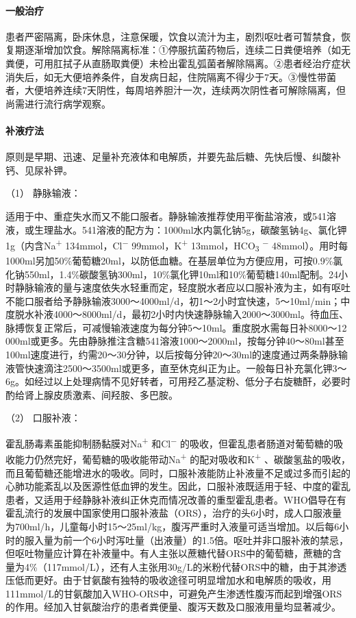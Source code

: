 \paragraph{一般治疗}

患者严密隔离，卧床休息，注意保暖，饮食以流汁为主，剧烈呕吐者可暂禁食，恢复期逐渐增加饮食。解除隔离标准：①停服抗菌药物后，连续二日粪便培养（如无粪便，可用肛拭子从直肠取粪便）未检出霍乱弧菌者解除隔离。②患者经治疗症状消失后，如无大便培养条件，自发病日起，住院隔离不得少于7天。③慢性带菌者，大便培养连续7天阴性，每周培养胆汁一次，连续两次阴性者可解除隔离，但尚需进行流行病学观察。

\paragraph{补液疗法}

原则是早期、迅速、足量补充液体和电解质，并要先盐后糖、先快后慢、纠酸补钙、见尿补钾。

\hypertarget{text00229.htmlux5cux23CHP7-10-3-2-1}{}
（1） 静脉输液：

适用于中、重症失水而又不能口服者。静脉输液推荐使用平衡盐溶液，或541溶液，或生理盐水。541溶液的配方为：1000ml水内氯化钠5g，碳酸氢钠4g、氯化钾1g（内含Na\textsuperscript{+}
134mmol，Cl\textsuperscript{−} 99mmol，K\textsuperscript{+}
13mmol，HCO\textsubscript{3} \textsuperscript{−}
48mmol）。用时每1000ml另加50\%葡萄糖20ml，以防低血糖。在基层单位为方便应用，可按0.9\%氯化钠550ml，1.4\%碳酸氢钠300ml，10\%氯化钾10ml和10\%葡萄糖140ml配制。24小时静脉输液的量与速度依失水轻重而定，轻度脱水者应以口服补液为主，如有呕吐不能口服者给予静脉输液3000～4000ml/d，初1～2小时宜快速，5～10ml/min；中度脱水补液4000～8000ml/d，最初2小时内快速静脉输入2000～3000ml。待血压、脉搏恢复正常后，可减慢输液速度为每分钟5～10ml。重度脱水需每日补8000～12
000ml或更多。先由静脉推注含糖541溶液1000～2000ml，按每分钟40～80ml甚至100ml速度进行，约需20～30分钟，以后按每分钟20～30ml的速度通过两条静脉输液管快速滴注2500～3500ml或更多，直至休克纠正为止。一般每日补充氯化钾3～6g。如经过以上处理病情不见好转者，可用羟乙基淀粉、低分子右旋糖酐，必要时酌给肾上腺皮质激素、间羟胺、多巴胺。

\hypertarget{text00229.htmlux5cux23CHP7-10-3-2-2}{}
（2） 口服补液：

霍乱肠毒素虽能抑制肠黏膜对Na\textsuperscript{+} 和Cl\textsuperscript{−}
的吸收，但霍乱患者肠道对葡萄糖的吸收能力仍然完好，葡萄糖的吸收能带动Na\textsuperscript{+}
的配对吸收和K\textsuperscript{+}
、碳酸氢盐的吸收，而且葡萄糖还能增进水的吸收。同时，口服补液能防止补液量不足或过多而引起的心肺功能紊乱以及医源性低血钾的发生。因此，口服补液既适用于轻、中度的霍乱患者，又适用于经静脉补液纠正休克而情况改善的重型霍乱患者。WHO倡导在有霍乱流行的发展中国家使用口服补液盐（ORS），治疗的头6小时，成人口服液量为700ml/h，儿童每小时15～25ml/kg，腹泻严重时入液量可适当增加。以后每6小时的服入量为前一个6小时泻吐量（出液量）的1.5倍。呕吐并非口服补液的禁忌，但呕吐物量应计算在补液量中。有人主张以蔗糖代替ORS中的葡萄糖，蔗糖的含量为4\%（117mmol/L），还有人主张用30g/L的米粉代替ORS中的糖，由于其渗透压低而更好。由于甘氨酸有独特的吸收途径可明显增加水和电解质的吸收，用111mmol/L的甘氨酸加入WHO-ORS中，可避免产生渗透性腹泻而起到增强ORS的作用。经加入甘氨酸治疗的患者粪便量、腹泻天数及口服液用量均显著减少。

